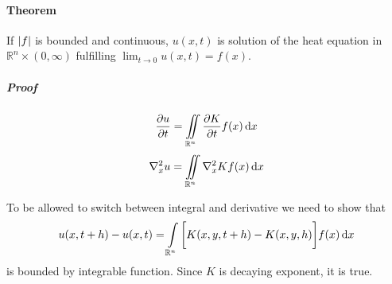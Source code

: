 \paragraph{Theorem} 
If $\abs{f}$ is bounded and continuous, $u(x,t)$ is solution of the heat equation in $\mathbb{R}^n \times (0, \infty)$ fulfilling $\lim_{t\to0} u(x,t) = f(x)$.
\subparagraph{Proof}
$$\pdv{u}{t} = \iint\limits_{\mathbb{R}^n} \pdv{K}{t} f(x) \dd{x}$$
$$\laplacian_x{u} = \iint\limits_{\mathbb{R}^n} \laplacian_x{K} f(x) \dd{x}$$

To be allowed to switch between integral and derivative we need to show that
$$u(x,t+h) - u(x,t) = \int\limits_{\mathbb{R}^n} \qty\bigg[K(x,y,t+h) -K(x,y,h) ] f(x) \dd{x}$$
is bounded by integrable function. Since $K$ is decaying exponent, it is true.


